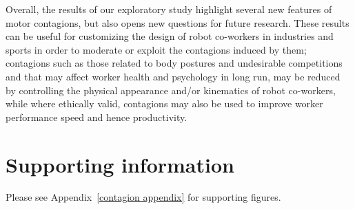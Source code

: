 Overall, the results of our exploratory study highlight several new features of motor contagions, but also opens new questions for future research. These results can be useful for customizing the design of robot co-workers in industries and sports in order to moderate or exploit the contagions induced by them; contagions such as those related to body postures and undesirable competitions and that may affect worker health and psychology in long run, may be reduced by controlling the physical appearance and/or kinematics of robot co-workers, while where ethically valid, contagions may also be used to improve worker performance speed and hence productivity.



\section*{Supporting information}

Please see Appendix~\ref{contagion appendix} for supporting figures.


\clearpage
